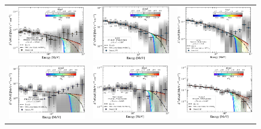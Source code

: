 \documentclass[twocolumn]{aastex62}
\begin{document}
\begin{figure}
    \centering
    \begin{tabular}{ccc}
    \includegraphics[width=0.32\linewidth]{sed_PKSB1222+216_t001_LogParabola_3min_ring_emin1000.pdf} &
    \includegraphics[width=0.32\linewidth]{sed_3C279_t001_LogParabola_3min_ring_emin1000.pdf} & 
    \includegraphics[width=0.32\linewidth]{sed_3C279_t003_LogParabola_3min_ring_emin1000.pdf}\\
    \includegraphics[width=0.32\linewidth]{sed_PKS1510-089_t005_LogParabola_3min_ring_emin1000.pdf} &
    \includegraphics[width=0.32\linewidth]{sed_PKS1510-089_t006_LogParabola_3min_ring_emin1000.pdf} & 
    \includegraphics[width=0.32\linewidth]{sed_3C454p3_t001_LogParabola_3min_ring_emin1000.pdf}\\

\end{tabular}
\end{figure}
\end{document}
